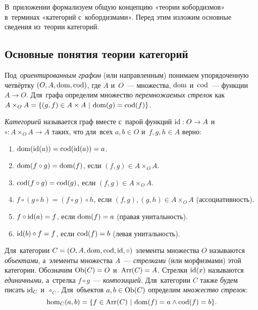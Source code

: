 \documentclass[a4paper,oneside]{article}
\begin{document}
\label{TheEnd}
\pagebreak

\renewcommand{\thesection}{\Alph{section}}
\setcounter{section}{1}
\setcounter{subsection}{0}


В~приложении формализуем общую концепцию «теории кобордизмов» в~терминах «категорий с~кобордизмами».
Перед этим изложим основные сведения из~теории категорий.

\subsection{Основные понятия теории категорий}

Под~\textit{ориентированным графом} (или направленным) \cite{MacLane71} понимаем упорядоченную четвёртку $(O,\allowbreak A,\allowbreak \mathrm{dom},\allowbreak \mathrm{cod})$,
где $A$ и~$O$~— множества, $\mathrm{dom}$ и~$\mathrm{cod}$~— функции $A \rightarrow O$.
Для~графа определим множество \textit{перемножаемых стрелок} как $A \times_O A = \{ (g, f) \in A \times A \ |\ \dom(g) = \cod(f) \}$.

\textit{Категорией} называется граф вместе с~парой функций $\mathrm{id} : O \rightarrow A$
и~$\circ : A \times_O A \rightarrow A$ таких, что для~всех $a, b \in O$ и~$f, g, h \in A$ верно:
\begin{enumerate}
    \item $\mathrm{dom}(\mathrm{id}(a)) = \mathrm{cod}(\mathrm{id}(a)) = a$.
    \item $\mathrm{dom}(f \circ g) = \mathrm{dom}(f)$, если $(f, g) \in A \times_O A$.
    \item $\mathrm{cod}(f \circ g) = \mathrm{cod}(g)$, если $(f, g) \in A \times_O A$.
    \item $f \circ (g \circ h) = (f \circ g) \circ h$, если $(f, g), (g, h) \in A \times_O A$ (ассоциативность).
    \item $f \circ \mathrm{id}(a) = f$, если $\mathrm{dom}(f) = a$ (правая унитальность).
    \item $\mathrm{id}(b) \circ f = f$, если $\mathrm{cod}(f) = b$ (левая унитальность).
\end{enumerate}

Для~категории $C = (O, A, \mathrm{dom}, \mathrm{cod}, \mathrm{id}, \circ)$ элементы множества $O$ называются \textit{объектами},
а~элементы множества $A$~— \textit{стрелками} (или морфизмами) этой категории. Обозначим $\mathrm{Ob}(C) = O$ и~$\mathrm{Arr}(C) = A$.
Стрелки $\mathrm{id}(x)$ называются \textit{единичными,} а~стрелка $f \circ g$~— \textit{композицией.} Для~категории $C$ также будем писать $\mathrm{id}_C$ и~$\circ_C$.
Для~объектов $a, b \in \mathrm{Ob}(C)$ определим \textit{множество стрелок}:
$$
    \hom_C(a, b) = \{ f \in \mathrm{Arr}(C)\ | \ \mathrm{dom}(f) = a \wedge \mathrm{cod}(f) = b \}.
$$
\end{document}
